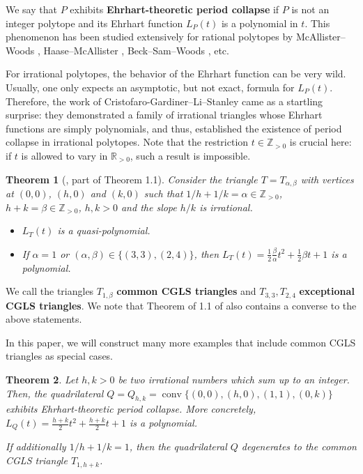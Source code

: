 \documentclass[a4paper]{article}
\newtheorem{thm}{Theorem}
\DeclareMathOperator{\conv}{conv}
\begin{document}

We say that $P$ exhibits \textbf{Ehrhart-theoretic period collapse} if $P$ is not an integer polytope and its Ehrhart function $L_P(t)$ is a polynomial in $t$. This phenomenon has been studied extensively for rational polytopes by McAllister--Woods \cite{mcallister2003minimum}, Haase--McAllister \cite{mcallister2003minimum}, Beck--Sam--Woods \cite{beck2007maximal}, etc. 

For irrational polytopes, the behavior of the Ehrhart function can be very wild. Usually, one only expects an asymptotic, but not exact, formula for $L_P(t)$. Therefore, the work of Cristofaro-Gardiner--Li--Stanley \cite{cristofaro2015new} came as a startling surprise: they demonstrated a family of irrational triangles whose Ehrhart functions are simply polynomials, and thus, established the existence of period collapse in irrational polytopes. Note that the restriction $t \in \mathbb{Z}_{>0}$ is crucial here: if $t$ is allowed to vary in $\mathbb{R}_{>0}$, such a result is impossible.

\begin{thm}[\cite{cristofaro2015new}, part of Theorem 1.1]
	Consider the triangle $T = T_{\alpha,\beta}$ with vertices at $(0,0)$, $(h,0)$ and $(k,0)$ such that $1/h + 1/k = \alpha \in \mathbb{Z}_{>0}$, $h + k = \beta \in \mathbb{Z}_{>0}$, $h,k > 0$ and the slope $h/k$ is irrational.
    \begin{itemize}
    \item $L_T(t)$ is a quasi-polynomial.
    \item If $\alpha = 1$ or $(\alpha,\beta) \in \{(3,3),(2,4)\}$, then $L_T(t) = \frac{1}{2} \frac{\beta}{\alpha} t^2 + \frac{1}{2} \beta t + 1$ is a polynomial.
    \end{itemize}
\end{thm}

We call the triangles $T_{1,\beta}$ \textbf{common CGLS triangles} and $T_{3,3}, T_{2,4}$ \textbf{exceptional CGLS triangles}. We note that Theorem of 1.1 of \cite{cristofaro2015new} also contains a converse to the above statements.

In this paper, we will construct many more examples that include common CGLS triangles as special cases. 
\begin{thm}\label{thm:quad}
	Let $h,k > 0$ be two irrational numbers which sum up to an integer. Then, the quadrilateral $Q = Q_{h,k} = \conv\{(0,0),(h,0),(1,1),(0,k)\}$ exhibits Ehrhart-theoretic period collapse. More concretely, $L_Q(t) = \frac{h+k}{2} t^2 + \frac{h+k}{2} t + 1$ is a polynomial.
    
    If additionally $1/h + 1/k = 1$, then the quadrilateral $Q$ degenerates to the common CGLS triangle $T_{1,h+k}$.
\end{thm}
\end{document}
